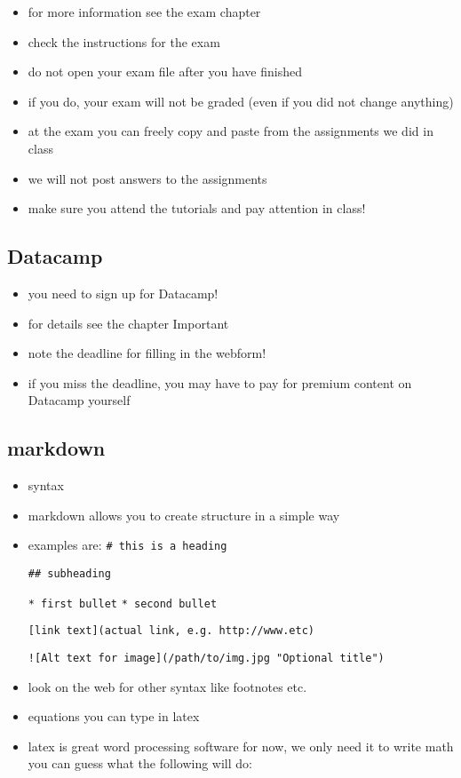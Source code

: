 \documentclass[]{book}
\providecommand{\tightlist}{%
  \setlength{\itemsep}{0pt}\setlength{\parskip}{0pt}}
\begin{document}
\begin{itemize}
\tightlist
\item
  for more information see the exam chapter
\item
  check the instructions for the exam
\item
  do not open your exam file after you have finished
\item
  if you do, your exam will not be graded (even if you did not change
  anything)
\item
  at the exam you can freely copy and paste from the assignments we did
  in class
\item
  we will not post answers to the assignments
\item
  make sure you attend the tutorials and pay attention in class!
\end{itemize}

\subsection{Datacamp}\label{datacamp-1}

\begin{itemize}
\tightlist
\item
  you need to sign up for Datacamp!
\item
  for details see the chapter Important
\item
  note the deadline for filling in the webform!
\item
  if you miss the deadline, you may have to pay for premium content on
  Datacamp yourself
\end{itemize}

\subsection{markdown}\label{markdown}

\begin{itemize}
\item
  syntax
\item
  markdown allows you to create structure in a simple way
\item
  examples are: \texttt{\#\ this\ is\ a\ heading}

  \texttt{\#\#\ subheading}

  \texttt{*\ first\ bullet} \texttt{*\ second\ bullet}

  \texttt{{[}link\ text{]}(actual\ link,\ e.g.\ http://www.etc)}

  \texttt{!{[}Alt\ text\ for\ image{]}(/path/to/img.jpg\ "Optional\ title")}
\item
  look on the web for other syntax like footnotes etc.
\item
  equations you can type in latex
\item
  latex is great word processing software for now, we only need it to
  write math you can guess what the following will do:
\end{itemize}
\end{document}
